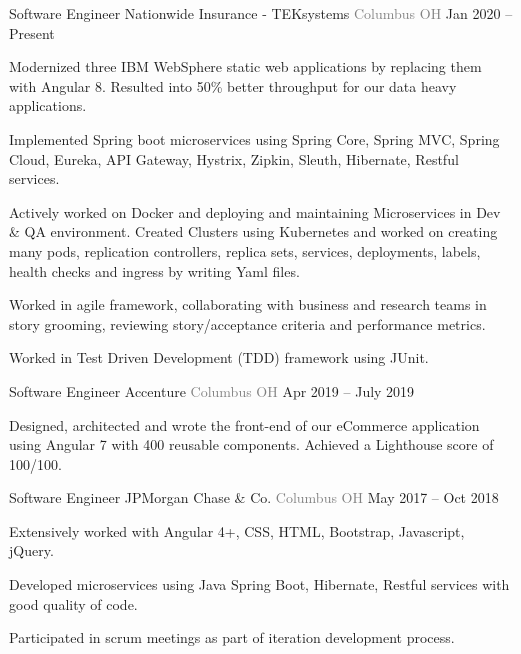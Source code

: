 \vspace{-2mm}
\begin{cventries}
    \vspace{-1mm}  \cventry
    {Software Engineer}
    {\hspace*{0.5mm}\bullet \hspace*{0.5mm} Nationwide Insurance - TEKsystems }
    {\textcolor{graytext}{Columbus OH}}
    {Jan 2020 – Present}
    {\begin{cvitems}\item {Modernized three IBM WebSphere static web applications by replacing them with Angular 8. Resulted into 50\% better throughput for our data heavy applications.}\item {Implemented Spring boot microservices using Spring Core, Spring MVC, Spring Cloud, Eureka, API Gateway, Hystrix, Zipkin, Sleuth, Hibernate, Restful services.  }\item {Actively worked on Docker and deploying and maintaining Microservices in Dev \& QA environment. Created Clusters using Kubernetes and worked on creating many pods, replication controllers, replica sets, services, deployments, labels, health checks and ingress by writing Yaml files. }  \item {Worked in agile framework, collaborating with business and research teams in story grooming, reviewing story/acceptance criteria and performance metrics.}   \item {Worked in Test Driven Development (TDD) framework using JUnit.}\end{cvitems}   \vspace{-1mm}   
    }
\cventry
    {Software Engineer}
    {\hspace*{0.5mm}\bullet \hspace*{0.5mm} Accenture}
    {\textcolor{graytext}{Columbus OH}}
    {Apr 2019 – July 2019}
    {\begin{cvitems}\item {Designed, architected and wrote the front-end of our eCommerce application using Angular 7 with 400 reusable components. Achieved a Lighthouse score of 100/100.}
\end{cvitems}   \vspace{-1mm}   
    }   
\cventry
    {Software Engineer}
    {\hspace*{0.5mm}\bullet \hspace*{0.5mm} JPMorgan Chase \& Co.}
    {\textcolor{graytext}{Columbus OH}}
    {May 2017 – Oct 2018}
    {\begin{cvitems}\item {Extensively worked with Angular 4+, CSS, HTML, Bootstrap, Javascript, jQuery. }\item {Developed microservices using Java Spring Boot, Hibernate, Restful services with good quality of code.}\item {Participated in scrum meetings as part of iteration development process.}\end{cvitems}
    }   
\end{cventries}
